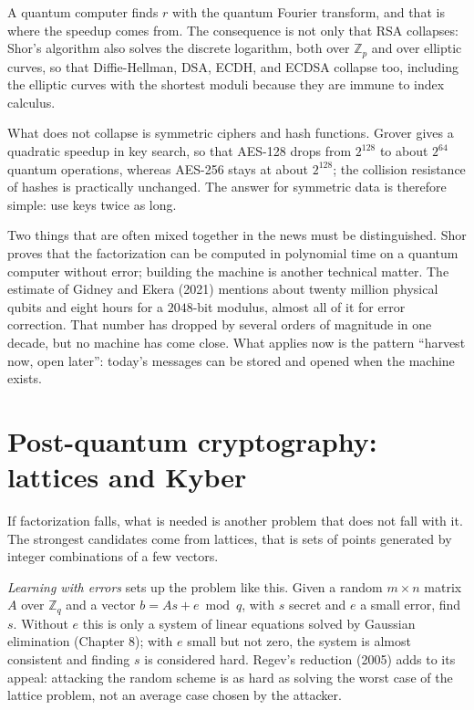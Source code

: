 A quantum computer finds $r$ with the quantum Fourier transform, and that is where the speedup comes
from. The consequence is not only that RSA collapses: Shor's algorithm also solves the discrete
logarithm, both over $\mathbb{Z}_p$ and over elliptic curves, so that Diffie-Hellman, DSA, ECDH, and
ECDSA collapse too, including the elliptic curves with the shortest moduli because they are immune to
index calculus.

What does not collapse is symmetric ciphers and hash functions. Grover gives a quadratic speedup in
key search, so that AES-128 drops from $2^{128}$ to about $2^{64}$ quantum operations, whereas
AES-256 stays at about $2^{128}$; the collision resistance of hashes is practically unchanged. The
answer for symmetric data is therefore simple: use keys twice as long.

Two things that are often mixed together in the news must be distinguished. Shor proves that the
factorization can be computed in polynomial time on a quantum computer without error; building the
machine is another technical matter. The estimate of Gidney and Ekera (2021) mentions about twenty
million physical qubits and eight hours for a $2048$-bit modulus, almost all of it for error
correction. That number has dropped by several orders of magnitude in one decade, but no machine has
come close. What applies now is the pattern ``harvest now, open later'': today's messages can be
stored and opened when the machine exists.

\section{Post-quantum cryptography: lattices and Kyber}

If factorization falls, what is needed is another problem that does not fall with it. The strongest
candidates come from lattices, that is sets of points generated by integer combinations of a few
vectors.

\emph{Learning with errors} sets up the problem like this. Given a random $m\times n$ matrix $A$ over
$\mathbb{Z}_q$ and a vector $b=As+e\bmod q$, with $s$ secret and $e$ a small error, find $s$. Without
$e$ this is only a system of linear equations solved by Gaussian elimination (Chapter 8); with $e$
small but not zero, the system is almost consistent and finding $s$ is considered hard. Regev's
reduction (2005) adds to its appeal: attacking the random scheme is as hard as solving the worst case
of the lattice problem, not an average case chosen by the attacker.

